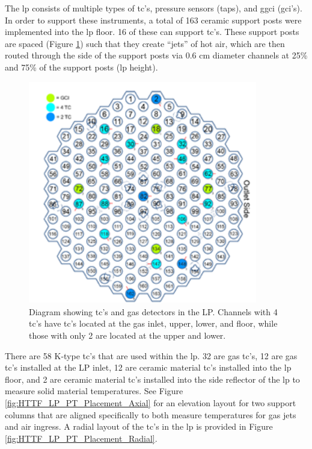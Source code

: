 \documentclass[double,12pt]{beavtex}
\begin{document}
The \acrshort{lp} consists of multiple types of \acrshort{tc}'s, pressure sensors (taps), and g\acrlong{gci} (\acrshort{gci}’s). In order to support these instruments, a total of 163 ceramic support posts were implemented into the \acrshort{lp} floor. 16 of these can support \acrshort{tc}'s. These support posts are spaced (Figure \ref{fig:HTTF_LP_Support_Posts}) such that they create “jets” of hot air, which are then routed through the side of the support posts via 0.6 cm diameter channels at 25\% and 75\% of the support posts (\acrshort{lp} height). 

\begin{figure}
    \begin{center}
    	\includegraphics[width=10cm]{Figures/HTTF_LP_Support_Posts.png}
    	\caption{Diagram showing \acrshort{tc}'s and gas detectors in the LP. Channels with 4 \acrshort{tc}'s have \acrshort{tc}'s located at the gas inlet, upper, lower, and floor, while those with only 2 are located at the upper and lower.}
    	\label{fig:HTTF_LP_Support_Posts}
    	\end{center}
\end{figure}

There are 58 K-type \acrshort{tc}'s that are used within the \acrshort{lp}. 32 are gas \acrshort{tc}'s, 12 are gas \acrshort{tc}'s installed at the LP inlet, 12 are ceramic material \acrshort{tc}'s installed into the \acrshort{lp} floor, and 2 are ceramic material \acrshort{tc}'s installed into the side reflector of the \acrshort{lp} to measure solid material temperatures. See Figure \ref{fig:HTTF_LP_PT_Placement_Axial} for an elevation layout for two support columns that are aligned specifically to both measure temperatures for gas jets and air ingress. A radial layout of the \acrshort{tc}'s in the \acrshort{lp} is provided in Figure \ref{fig:HTTF_LP_PT_Placement_Radial}.
\end{document}
